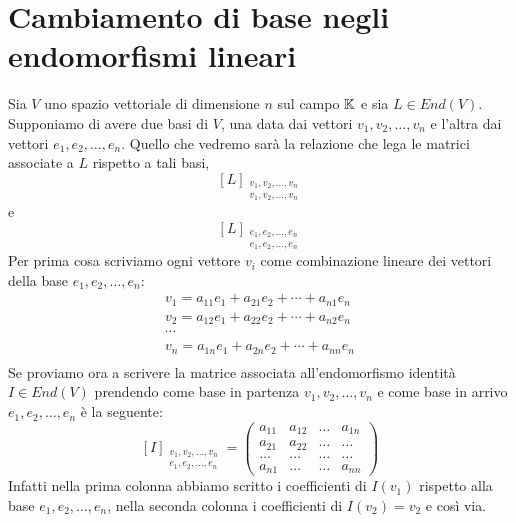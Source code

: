 \section{Cambiamento di base negli endomorfismi lineari}
Sia $V$ uno spazio vettoriale di dimensione $n$ sul campo $\mathbb{K}$
e sia $L \in End(V)$. Supponiamo di avere due basi di $V$, una data dai vettori
$v_1, v_2, \dots, v_n$ e l'altra dai vettori $e_1, e_2, \dots, e_n$. Quello che
vedremo sarà la relazione che lega le matrici associate a $L$ rispetto a tali
basi,
\[
	[L]_{\substack{
				v_1, v_2, \dots, v_n \\
				v_1, v_2, \dots, v_n
			}}
\]
e
\[
	[L]_{\substack{
				e_1, e_2, \dots, e_n \\
				e_1, e_2, \dots, e_n
			}}
\]
Per prima cosa scriviamo ogni vettore $v_i$ come combinazione lineare dei vettori
della base $e_1, e_2, \dots, e_n$:
\begin{gather*}
	v_1 = a_{11}e_1 + a_{21}e_2 + \cdots + a_{n1}e_n \\
	v_2 = a_{12}e_1 + a_{22}e_2 + \cdots + a_{n2}e_n \\
	\cdots                                           \\
	v_n = a_{1n}e_1 + a_{2n}e_2 + \cdots + a_{nn}e_n \\
\end{gather*}
Se proviamo ora a scrivere la matrice associata all'endomorfismo identità
$I \in End(V)$ prendendo come base in partenza $v_1, v_2, \dots, v_n$ e come base
in arrivo $e_1, e_2, \dots, e_n$ è la seguente:
\[
	[I]_{\substack{
				v_1, v_2, \dots, v_n \\
				e_1, e_2, \dots, e_n
			}} = \begin{pmatrix}
		a_{11} & a_{12} & \dots & a_{1n} \\
		a_{21} & a_{22} & \dots & \dots  \\
		\dots  & \dots  & \dots & \dots  \\
		a_{n1} & \dots  & \dots & a_{nn}
	\end{pmatrix}
\]
Infatti nella prima colonna abbiamo scritto i coefficienti di $I(v_1)$ rispetto
alla base $e_1, e_2, \dots, e_n$, nella seconda colonna i coefficienti di
$I(v_2) = v_2$ e così via.

